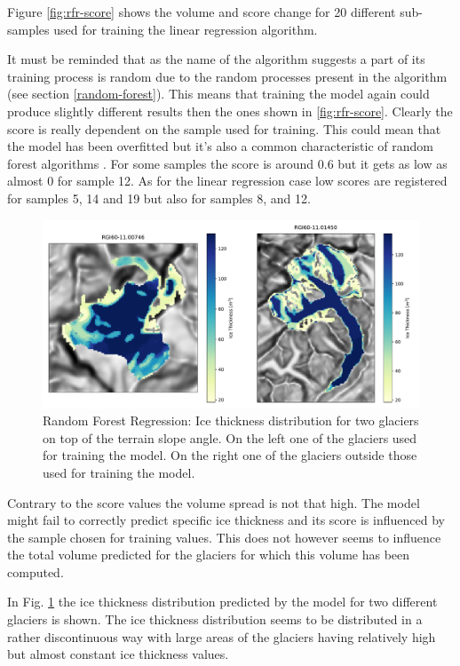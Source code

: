 Figure \ref{fig:rfr-score} shows the volume and score change for 20 different sub-samples used for training the linear regression algorithm. 

It must be reminded that as the name of the algorithm suggests a part of its training process is random due to the random processes present in the algorithm (see section \ref{random-forest}). This means that training the model again could produce slightly different results then the ones shown in \ref{fig:rfr-score}.
Clearly the score is really dependent on the sample used for training. This could mean that the model has been overfitted but it's also a common characteristic of random forest algorithms \cite{RandomForest2018}. For some samples the score is around 0.6 but it gets as low as almost 0 for sample 12. As for the linear regression case low scores are registered for samples 5, 14 and 19 but also for samples 8, and 12. 


\begin{figure}[!tp]
	\centering		  
	\includegraphics[width=1.\textwidth]{figures/RFR_thick_map.pdf}
	\caption{Random Forest Regression: Ice thickness distribution for two glaciers on top of the terrain slope angle. On the left one of the glaciers used for training the model. On the right one of the glaciers outside those used for training the model.}
	\label{fig:rfr-map}
\end{figure}

Contrary to the score values the volume spread is not that high. The model might fail to correctly predict specific ice thickness and its score is influenced by the sample chosen for training values. This does not however seems to influence the total volume predicted for the glaciers for which this volume has been computed.

In Fig. \ref{fig:rfr-map} the ice thickness distribution predicted by the model for two different glaciers is shown. The ice thickness distribution seems to be distributed in a rather discontinuous way with large areas of the glaciers having relatively high but almost constant ice thickness values. 

